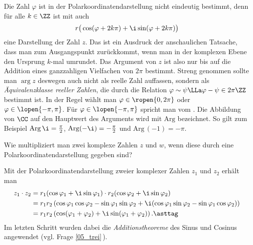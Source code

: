 \begin{antwort}
  Die Zahl $\varphi$ ist in der Polarkoordinatendarstellung 
  {\astref} nicht eindeutig bestimmt, denn für alle $k\in\ZZ$ 
  ist mit {\astref} auch 
  \[
  r \big( \cos (\varphi +2k\pi)+\i\sin( \varphi + 2k\pi ) \big)
  \]
  eine Darstellung der Zahl $z$. Das ist ein Ausdruck der 
  anschaulichen Tatsache, dass man zum Ausgangspunkt zurückkommt, 
  wenn man in der komplexen Ebene den Ursprung $k$-mal umrundet. 
  Das Argument von $z$ ist also nur bis auf die Addition 
  eines ganzzahligen Vielfachen von $2\pi$ bestimmt. Streng 
  genommen sollte man $\arg z$ deswegen auch nicht als reelle 
  Zahl auffassen, sondern als \textit{\"Aquivalenzklasse reeller Zahlen}, die 
  durch die Relation $\varphi \sim \psi \LLa \varphi-\psi \in 2\pi\ZZ$ 
  bestimmt ist. 
  In der Regel wählt man $\varphi\in \ropen{0,2\pi}$ 
  oder $\varphi \in \lopen{-\pi,\pi}$. Für $\varphi \in \lopen{-\pi,\pi}$ 
  spricht man vom . 
  Die Abbildung von $\CC$ auf den Hauptwert des Arguments wird 
  mit $\mathrm{Arg}$ bezeichnet. 
  So gilt zum Beispiel $\mathrm{Arg}\,\i = \frac\pi2$, 
  $\mathrm{Arg}(-\i)=-\frac\pi2$ und $\mathrm{Arg}\,(-1)=-\pi$.
  \AntEnd
\end{antwort}






\begin{frage}\label{polarmult}
  Wie multipliziert man zwei komplexe Zahlen $z$ und $w$, wenn diese 
  durch eine Polarkoordinatendarstellung gegeben sind?
\end{frage}

\begin{antwort}
  Mit der Polarkoordinatendarstellung zweier komplexer Zahlen $z_1$ und 
  $z_2$ erhält man
  \begin{align*}
    z_1\cdot z_2 &= r_1( \cos \varphi_1 + \i \sin  \varphi_1 )\cdot 
    r_2 ( \cos \varphi_2 + \i\sin \varphi_2 ) \\
    &=  r_1 r_2 \left( \cos\varphi_1\cos\varphi_2 - 
      \sin\varphi_1 \sin\varphi_2 + \i
      ( \cos\varphi_1\sin\varphi_2 - \sin\varphi_1 \cos\varphi_2 ) \right) \\
    &= r_1 r_2 \left( \cos( \varphi_1 + \varphi_2) + 
      \i\sin( \varphi_1 + \varphi_2 ) \right).\asttag
  \end{align*}
  Im letzten Schritt wurden dabei die \textit{Additionstheoreme} des 
  Sinus und Cosinus angewendet (vgl. Frage \ref{05_trei}\,). 
  \AntEnd
\end{antwort} 






